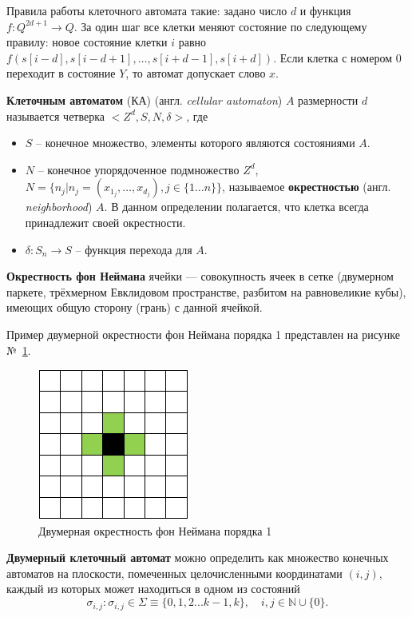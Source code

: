 \documentclass[a4paper, final]{article}
\begin{document}
Правила работы клеточного автомата такие: задано число $d$ и функция $f: Q^{2d+1} \rightarrow Q$. 
За один шаг все клетки меняют состояние по следующему правилу: новое состояние клетки $i$ равно 
$f(s[i-d],s[i-d+1],\dots,s[i+d-1],s[i+d])$. Если клетка с номером 0 переходит в состояние $Y$, 
то автомат допускает слово $x$.

\textbf{Клеточным автоматом} (КА) (англ. \textit{cellular automaton}) $A$ размерности $d$ 
называется четверка $<Z^d,S,N,\delta>$, где
\begin{itemize}
\item $S$ -- конечное множество, элементы которого являются состояниями $A$.
\item $N$ -- конечное упорядоченное подмножество $Z^d$, $N=\{n_j | n_j = (x_{1_j},\dots,x_{d_j}),
j \in \{1 \dots n\}\}$, называемое \textbf{окрестностью} (англ. \textit{neighborhood}) $A$.
В данном определении полагается, что клетка всегда принадлежит своей окрестности.
\item $\delta : S_n \rightarrow S$ -- функция перехода для $A$. \cite{bib:linearcellularautomaton}
\end{itemize}

\textbf{Окрестность фон Неймана} ячейки --- совокупность ячеек в сетке 
(двумерном паркете, трёхмерном Евклидовом пространстве, разбитом на равновеликие кубы), 
имеющих общую сторону (грань) с данной ячейкой. \cite{bib:cellularautomaton}

Пример двумерной окрестности фон Неймана порядка 1 представлен на рисунке №~\ref{img:neyman}.
\begin{figure}[H]
   \centering
   \includegraphics[scale=1]{neyman.png}
   \caption{Двумерная окрестность фон Неймана порядка 1}
   \label{img:neyman}
\end{figure}

\textbf{Двумерный клеточный автомат} можно определить как множество конечных автоматов на плоскости, 
помеченных целочисленными координатами $(i, j)$, каждый из которых может находиться в одном из состояний
$$\sigma _{i,j}: \sigma _{i,j}\in \Sigma \equiv \{0,1,2...k-1,k\}, \quad i, j \in \mathbb{N} \cup \{0\}.$$
\end{document}
